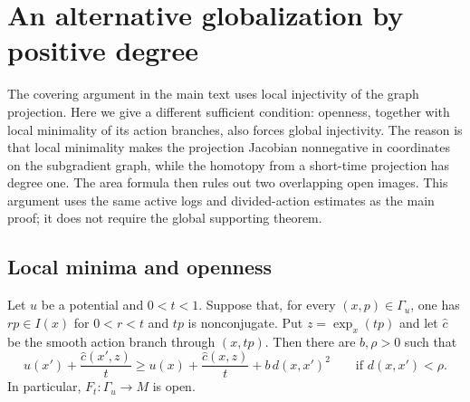 \section{An alternative globalization by positive degree}
\label{sec:degree-alternative}

The covering argument in the main text uses local injectivity of the
graph projection.  Here we give a different sufficient condition:
openness, together with local minimality of its action branches, also
forces global injectivity.  The reason is that local minimality makes
the projection Jacobian nonnegative in coordinates on the subgradient
graph, while the homotopy from a short-time projection has degree one.
The area formula then rules out two overlapping open images.
This argument uses the same active logs and divided-action estimates
as the main proof; it does not require the global supporting theorem.

\subsection{Local minima and openness}

\begin{lemma}
\label{geo:local-growth}
Let $u$ be a potential and $0<t<1$.  Suppose that, for every
$(x,p)\in\Gamma_u$, one has $rp\in I(x)$ for $0<r<t$ and $tp$
is nonconjugate.  Put $z=\exp_x(tp)$ and let $\hat c$ be the smooth
action branch through $(x,tp)$.  Then there are $b,\rho>0$ such that
\[
 u(x')+\frac{\hat c(x',z)}t
 \geq u(x)+\frac{\hat c(x,z)}t+b\,d(x,x')^2
 \qquad\text{if }d(x,x')<\rho.
\]
In particular, $F_t:\Gamma_u\to M$ is open.
\end{lemma}


